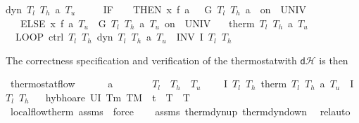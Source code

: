\documentclass[envcountsame,envcountsect]{llncs}
\newcommand{\dH}{\mathsf{d}\mathcal{H}}
\begin{document}
\begin{example}
\begin{isabellebody}
{\isachardoublequoteopen}dyn\ $T_l$\ $T_h$\ a\ $T_u$\ {\isasymtau}\ {\isasymequiv}\ \isanewline
\ \ IF\ {\isacharparenleft}{\isasymtheta}\ {\isacharequal}\ {}{\isacharparenright}\ THEN\ x{\isasymacute}{\isacharequal}\ f\ a\ {}\ {\isacharampersand}\ G\ $T_l$\ $T_h$\ a\ {}\ on\ {\isacharbraceleft}{}{\isachardot}{\isachardot}{\isasymtau}{\isacharbraceright}\ UNIV\ {\isacharat}\ {}\ \isanewline
\ \ \ ELSE\ x{\isasymacute}{\isacharequal}\ f\ a\ $T_u$\ {\isacharampersand}\ G\ $T_l$\ $T_h$\ a\ $T_u$\ on\ {\isacharbraceleft}{}{\isachardot}{\isachardot}{\isasymtau}{\isacharbraceright}\ UNIV\ {\isacharat}\ {}{\isachardoublequoteclose}\isanewline
\isanewline
{}\ {\isachardoublequoteopen}therm\ $T_l$\ $T_h$\ a\ $T_u$\ {\isasymtau}\ {\isasymequiv}\isanewline 
\ \ LOOP\ {\isacharparenleft}ctrl\ $T_l$\ $T_h${\isacharsemicolon}\ dyn\ $T_l$\ $T_h$\ a\ $T_u$\ {\isasymtau}{\isacharparenright}\ INV\ {\isacharparenleft}I\ $T_l$\ $T_h${\isacharparenright}{\isachardoublequoteclose}\isanewline
\end{isabellebody}

\noindent The correctness specification and verification of the
thermostatwith $\dH$  is then
\begin{isabellebody}
\isanewline
{}\isamarkupfalse%
\ thermostat{\isacharunderscore}flow{\isacharcolon}\ \isanewline
\ \ \ {\isachardoublequoteopen}{}\ {\isacharless}\ a{\isachardoublequoteclose}\ \ {\isachardoublequoteopen}{}\ {\isasymle}\ {\isasymtau}{\isachardoublequoteclose}\ \ {\isachardoublequoteopen}{}\ {\isacharless}\ $T_l${\isachardoublequoteclose}\ \ {\isachardoublequoteopen}$T_h$\ {\isacharless}\ $T_u${\isachardoublequoteclose}\isanewline
\ \ \ {\isachardoublequoteopen}\ \isactrlbold {\isacharbraceleft}I\ $T_l$\ $T_h$\isactrlbold {\isacharbraceright}\ therm\ $T_l$\ $T_h$\ a\ $T_u$\ {\isasymtau}\ \isactrlbold {\isacharbraceleft}I\ $T_l$\ $T_h$\isactrlbold {\isacharbraceright}{\isachardoublequoteclose}\isanewline
\ \ \isamarkupfalse%
{\isacharparenleft}hyb{\isacharunderscore}hoare\ {\isachardoublequoteopen}U{\isacharparenleft}I\ T\isactrlsub m\ T\isactrlsub M\ {\isasymand}\ t{\isacharequal}{}\ {\isasymand}\ T\ {\isacharequal}\ T{\isacharparenright}{\isachardoublequoteclose}{\isacharparenright}\isanewline
\ \ \isamarkupfalse%
\ {}\ \isamarkupfalse%
\ {}\ \isamarkupfalse%
\ local{\isacharunderscore}flow{\isacharunderscore}therm\ assms\ \isamarkupfalse\ force{\isacharplus}\isanewline
\ \ \isamarkupfalse%
\ assms\ therm{\isacharunderscore}dyn{\isacharunderscore}up\ therm{\isacharunderscore}dyn{\isacharunderscore}down\ \isamarkupfalse%
\ rel{\isacharunderscore}auto{\isacharprime}\isanewline
\end{isabellebody}


\end{example}
\end{document}

